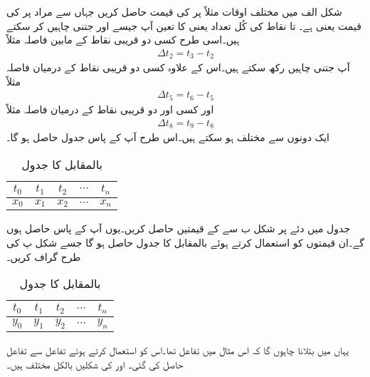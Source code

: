 شکل   الف میں مختلف اوقات مثلاً   پر  کی قیمت حاصل کریں جہاں   سے مراد  پر  کی قیمت یعنی  ہے۔ تا  نقاط کی کُل تعداد  یعنی   کا تعین آپ جیسے اور جتنی چاہیں کر سکتے ہیں۔اسی طرح کسی دو قریبی نقاط کے مابین فاصلہ مثلاً
\begin{align*}
\Delta t_2=t_3 -t_2
\end{align*}
آپ جتنی چاہیں رکھ سکتے ہیں۔اس کے علاوہ کسی دو قریبی نقاط کے درمیان فاصلہ مثلاً 
\begin{align*}
\Delta t_5=t_6-t_5
\end{align*}
اور کسی اور دو قریبی نقاط کے درمیان فاصلہ  مثلاً
\begin{align*}
\Delta t_8=t_9-t_8
\end{align*}
ایک دونوں سے مختلف ہو سکتے ہیں۔اس طرح آپ کے پاس جدول  حاصل ہو گا۔
\begin{table} [h]
\caption{ بالمقابل   کا جدول}
\label{جدول_ایکس_بالمقابل_ٹی}
\centering
\begin{LTR}
\begin{tabular}{c c c c c }
$ t_0 $ & $ t_1 $ & $ t_2 $ & $\cdots$ & $ t_n $ \\
\midrule
$ x_0 $ & $ x_1 $ & $ x_2 $ & $\cdots$ & $ x_n $ \\
\end{tabular}
\end{LTR}
\end{table}

جدول  میں دئے  پر شکل  ب سے  کے قیمتیں حاصل کریں۔یوں آپ کے پاس  حاصل ہوں گے۔ان قیمتوں کو استعمال کرتے ہوئے  بالمقابل  کا جدول  حاصل ہو گا جسے شکل  پ کی طرح گراف کریں۔
\begin{table} [h]
\caption{ بالمقابل   کا جدول}
\label{جدول_وائے_بالمقابل_ٹی}
\centering
\begin{LTR}
\begin{tabular}{c c c c c }
$ t_0 $ & $ t_1 $ & $ t_2 $ & $\cdots$ & $ t_n $ \\
\midrule
$ y_0 $ & $ y_1 $ & $ y_2 $ & $\cdots$ & $ y_n $ \\
\end{tabular}
\end{LTR}
\end{table}
یہاں میں بتلانا چاہوں گا کہ اس مثال میں تفاعل    تھا۔اس کو استعمال کرتے ہوئے تفاعل  سے تفاعل  حاصل کی گئی۔  اور  کی شکلیں بالکل مختلف ہیں۔

